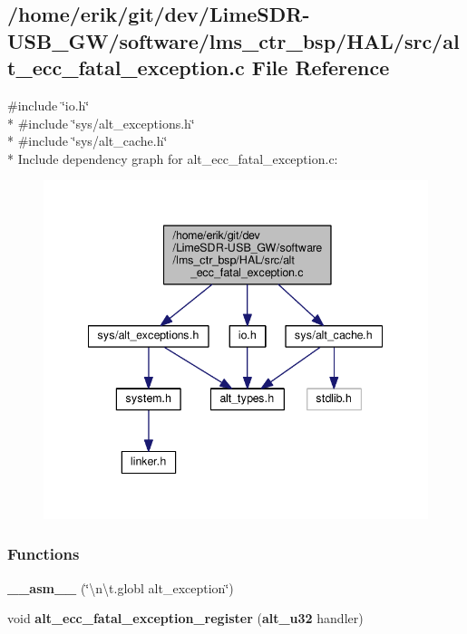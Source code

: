 \subsection{/home/erik/git/dev/\+Lime\+S\+D\+R-\/\+U\+S\+B\+\_\+\+G\+W/software/lms\+\_\+ctr\+\_\+bsp/\+H\+A\+L/src/alt\+\_\+ecc\+\_\+fatal\+\_\+exception.c File Reference}
\label{alt__ecc__fatal__exception_8c}
{\ttfamily \#include \char`\"{}io.\+h\char`\"{}}\\*
{\ttfamily \#include \char`\"{}sys/alt\+\_\+exceptions.\+h\char`\"{}}\\*
{\ttfamily \#include \char`\"{}sys/alt\+\_\+cache.\+h\char`\"{}}\\*
Include dependency graph for alt\+\_\+ecc\+\_\+fatal\+\_\+exception.\+c\+:
\nopagebreak
\begin{figure}[H]
\begin{center}
\leavevmode
\includegraphics[width=342pt]{dd/d3f/alt__ecc__fatal__exception_8c__incl}
\end{center}
\end{figure}
\subsubsection*{Functions}
\begin{DoxyCompactItemize}
\item 
{\bf \+\_\+\+\_\+asm\+\_\+\+\_\+} (\char`\"{}\textbackslash{}n\textbackslash{}t.\+globl alt\+\_\+exception\char`\"{})
\item 
void {\bf alt\+\_\+ecc\+\_\+fatal\+\_\+exception\+\_\+register} ({\bf alt\+\_\+u32} handler)
\end{DoxyCompactItemize}
